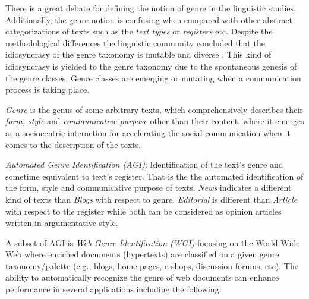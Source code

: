 There is a great debate for defining the notion of genre in the linguistic studies. Additionally, the genre notion is confusing when compared with other abstract categorizations of texts such as the \textit{text types} or \textit{registers} etc. Despite the methodological differences the linguistic community concluded that the idiosyncrasy of the genre taxonomy is mutable and diverse \parencite{coutinho2009describe}. This kind of idiosyncrasy is yielded to the genre taxonomy due to the spontaneous genesis of the genre classes. Genre classes are emerging or mutating when a communication process is taking place.

\begin{definition}{\textit{Genre}}
is the genus of some arbitrary texts, which comprehensively describes their \textit{form, style} and \textit{communicative purpose} other than their content, where it emerges as a sociocentric interaction for accelerating the social communication when it comes to the description of the texts.
\end{definition}

\textit{Automated Genre Identification (AGI)}: Identification of the text's genre and sometime equivalent to text's register. That is the the automated identification of the form, style and communicative purpose of texts. \textit{News} indicates a different kind of texts than \textit{Blogs} with respect to genre. \textit{Editorial} is different than \textit{Article} with respect to the register while both can be considered as opinion articles written in argumentative style.

A subset of AGI is \textit{Web Genre Identification (WGI)} focusing on the World Wide Web where enriched documents (hypertexts) are classified on a given genre taxonomy/palette (e.g., blogs, home pages, e-shops, discussion forums, etc). The ability to automatically recognize the genre of web documents can enhance performance in several applications including the following:

